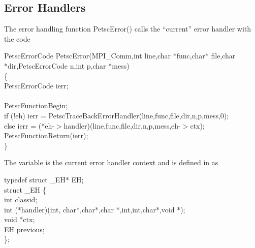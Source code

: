 \documentclass[twoside,12pt]{../sty/report_petsc}
\begin{document}
\subsection{Error Handlers}
The error handling function PetscError() calls the ``current'' error handler
with the code
\begin{tabbing}
PetscErrorCode PetscError(MPI\_Comm,int line,char *func,char* file,char *dir,PetscErrorCode n,int p,char *mess)\\
\{ \\
  PetscErrorCode ierr;\\
\\
  PetscFunctionBegin;\\
  if (!eh)     ierr = PetscTraceBackErrorHandler(line,func,file,dir,n,p,mess,0);\\
  else         ierr = (*eh-$>$handler)(line,func,file,dir,n,p,mess,eh-$>$ctx);\\
  PetscFunctionReturn(ierr);\\
\}
\end{tabbing}
The variable  is the current error handler context and is defined in 
 as
\begin{tabbing}
typedef struct \_EH* EH;\\
struct \_EH \{\\
  int    classid;\\
  int    (*handler)(int, char*,char*,char *,int,int,char*,void *);\\
  void   *ctx;\\
  EH     previous;\\
\};
\end{tabbing}
\end{document}
